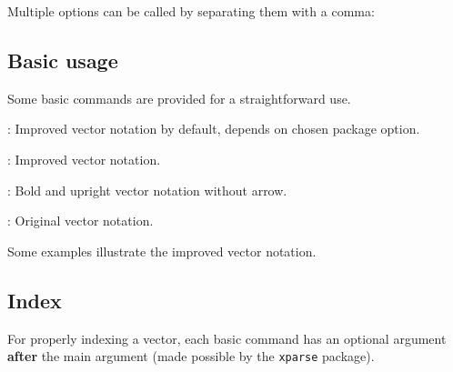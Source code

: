 \documentclass[12pt]{article}
\begin{document}
Multiple options can be called by separating them with a comma:


\subsection{Basic usage}

Some basic commands are provided for a straightforward use.\bigskip

\begin{bulItem}
\item {}: Improved vector notation by default, depends on chosen package option.\bigskip

\item {}: Improved vector notation.\medskip

{\centering{}\par}\bigskip

\item {}: Bold and upright vector notation without arrow.\medskip

{\centering{}\par}\bigskip

\item {}: Original vector notation.\medskip

{\centering{}\par}
\end{bulItem}\bigskip

Some examples illustrate the improved vector notation.\medskip

\begin{multicols}{2}
\medskip

\medskip

\medskip

\end{multicols}

\subsection{Index}

For properly indexing a vector, each basic command has an optional argument \textbf{after} the main argument (made possible by the \verb|xparse| package).\bigskip
\end{document}
